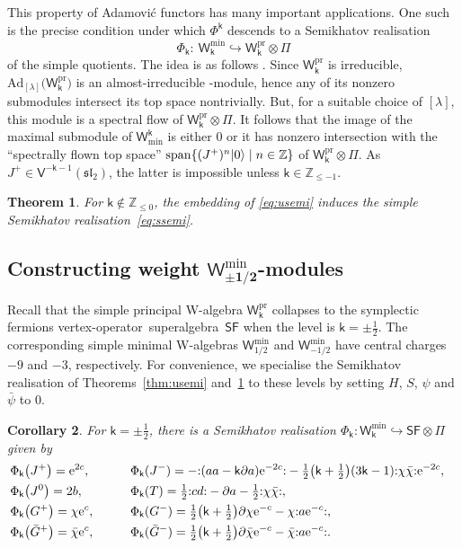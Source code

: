 \documentclass[pdftex]{sigma}
\numberwithin{equation}{section}
\newcommand{\pd}{\partial} %
\newcommand{\bchi}{\bar{\chi}{}} %
\newcommand{\bpsi}{\bar{\psi}{}} %
\newcommand{\bG}{\bar{G}{}}
\newcommand{\ee}{\mathrm{e}} %
\newcommand{\kk}{\mathsf{k}} %
\renewcommand{\le}{\leqslant} %
\DeclarePairedDelimiter{\brac}{\lparen}{\rparen} %
\newcommand{\no}[1]{\mathopen{:} #1 \mathclose{:}} %
\DeclarePairedDelimiter{\ket}{\lvert}{\rangle}
\DeclareMathOperator{\spn}{span}
\newcommand{\ira}{\hookrightarrow}
\newcommand{\fld}[1]{\mathbb{#1}} %
\newcommand{\alg}[1]{\mathfrak{#1}} %
\newcommand{\VOA}[1]{\mathsf{#1}} %
\newcommand{\categ}[1]{\mathrm{#1}} %
\newcommand{\ZZ}{\fld{Z}}
\newcommand{\SLA}[2]{\alg{#1}_{#2}} %
\newcommand{\sltwo}{\SLA{sl}{2}}
\newcommand{\sfsymb}{\VOA{SF}}
\newcommand{\lsymb}{\Pi}
\newcommand{\sfvoa}{\sfsymb} %
\newcommand{\lvoa}{\lsymb} %
\newcommand{\uaff}[2]{\VOA{V}^{#1}(#2)} %
\newcommand{\usl}[1][\kk]{\uaff{#1}{\sltwo}} %
\newcommand{\uwalg}[2]{\VOA{W}^{#1}_{\mathrm{#2}}} %
\newcommand{\swalg}[2]{\VOA{W}_{#1}^{\mathrm{#2}}} %
\newcommand{\umin}[1][\kk]{\uwalg{#1}{min}} %
\newcommand{\spr}[1][\kk]{\swalg{#1}{pr}} %
\newcommand{\smin}[1][\kk]{\swalg{#1}{min}} %
\newcommand{\sminpmhalf}{\smin[\pm 1/2]}
\newcommand{\adfunc}[1]{\categ{Ad}_{[#1]}}
\newcommand{\vo}{vertex-operator}
\newcommand{\svoa}{\vo\ superalgebra}
\newtheorem{Theorem}{Theorem}[section]
\newtheorem{Corollary}[Theorem]{Corollary}
\begin{document}
This property of Adamovi\'{c} functors has many important applications.
One such is the precise condition under which $\Phi^{\kk}$ descends to a Semikhatov realisation
\begin{equation} \label{eq:ssemi}
	\Phi_{\kk} \colon\ \smin \ira \spr \otimes \lvoa
\end{equation}
of the simple quotients.
The idea is as follows \cite{AdaRea20}.
Since $\spr$ is irreducible, $\adfunc{\lambda}\big(\spr\big)$ is an almost-irreducible \smash{$\umin$}-module, hence any of its nonzero submodules intersect its top space nontrivially.
But, for a suitable choice of $[\lambda]$, this module is a spectral flow of $\spr \otimes \lvoa$.
It follows that the image of the maximal submodule of $\umin$ is either $0$ or it has nonzero intersection with the ``spectrally flown top space'' $\spn\{(J^+)^n \ket{0} \mid n \in \ZZ\}$ of $\spr \otimes \lvoa$.
As $J^+ \in \usl[-\kk-1]$, the latter is impossible unless $\kk \in \ZZ_{\le-1}$.
%
\begin{Theorem} \label{thm:ssemi}
	For $\kk \notin \ZZ_{\le0}$, the embedding of \eqref{eq:usemi} induces the simple Semikhatov realisation~\eqref{eq:ssemi}.
\end{Theorem}

\subsection[Constructing weight sminpmhalf-modules]{Constructing weight $\boldsymbol{\sminpmhalf}$-modules} \label{sec:k=+-1/2}

Recall that the simple principal W-algebra $\spr$ collapses to the symplectic fermions \svoa\ $\sfvoa$ when the level is $\kk=\pm\frac{1}{2}$.
The corresponding simple minimal W-algebras $\smin[1/2]$ and $\smin[-1/2]$ have central charges $-9$ and $-3$, respectively.
For convenience, we specialise the Semikhatov realisation of Theorems~\ref{thm:usemi} and~\ref{thm:ssemi} to these levels by setting $H$, $S$, $\psi$ and $\bpsi$ to $0$.
%
\begin{Corollary} \label{cor:pmhalf}
	For $\kk = \pm\frac{1}{2}$, there is a Semikhatov realisation $\Phi_{\kk} \colon \smin \ira \sfvoa \otimes \lvoa$ given by
	\begin{alignat}{3}
 & \Phi_{\kk}\big(J^+\big) = \ee^{2c}, \qquad&&
 \Phi_{\kk}(J^-) = -\no{\brac*{aa - \kk \pd a} \ee^{-2c}} - \tfrac{1}{2}\bigl(\kk+\tfrac{1}{2}\bigr)(3\kk-1) \no{\chi \bchi} \ee^{-2c},&\nonumber \\
& \Phi_{\kk}\big(J^0\big) = 2b, \qquad&&
 \Phi_{\kk}(T) = \tfrac{1}{2} \no{cd} - \pd a - \tfrac{1}{2} \no{\chi\bchi},& \nonumber\\
& \Phi_{\kk}\big(G^+\big) = \chi \ee^c, \qquad&&
 \Phi_{\kk}(G^-) = \tfrac{1}{2}\bigl(\kk+\tfrac{1}{2}\bigr)\pd \chi \ee^{-c} - \chi \no{a \ee^{-c}},& \nonumber\\
& \Phi_{\kk}\big(\bG^+\big) = \bchi \ee^c, \qquad&&
 \Phi_{\kk}(\bG^-) = \tfrac{1}{2}\bigl(\kk+\tfrac{1}{2}\bigr)\pd \bchi \ee^{-c} - \bchi \no{a \ee^{-c}}.&\label{eq:simplequotemb}
	\end{alignat}
\end{Corollary}
\end{document}
